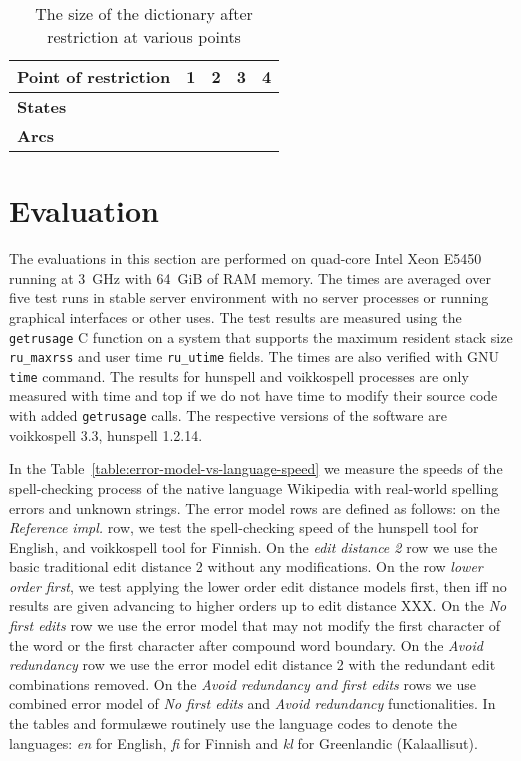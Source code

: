 \documentclass[11pt]{article}
\begin{document}
\begin{table}[h]
\begin{center}
\begin{scriptsize}
\begin{tabular}{|l|rrrr|}
\hline
\bf Point of restriction & \bf 1 & \bf 2 & \bf 3 & \bf 4 \\
\hline
\bf States \\
\bf Arcs \\
\hline
\end{tabular}
\caption{\label{restricted} The size of the dictionary after restriction at
various points}
\end{scriptsize}
\end{center}
\end{table}


\section{Evaluation}
\label{sec:evaluation}

The evaluations in this section are performed on quad-core Intel Xeon E5450
running at 3~GHz with 64~GiB of RAM memory. The times are averaged over five
test runs in stable server environment with no server processes or running
graphical interfaces or other uses. The test results are measured using the
\texttt{getrusage} C function on a system that supports the maximum resident
stack size \texttt{ru\_maxrss} and user time \texttt{ru\_utime} fields. The times
are also verified with GNU \texttt{time} command. The results for hunspell and
voikkospell processes are only measured with time and top if we do not have
time to modify their source code with added \texttt{getrusage} calls. The
respective versions of the software are voikkospell 3.3, hunspell 1.2.14.

In the Table~\ref{table:error-model-vs-language-speed} we measure the speeds of
the spell-checking process of the native language Wikipedia with real-world
spelling errors and unknown strings. The error model rows are defined as
follows: on the \emph{Reference impl.} row, we test the spell-checking speed of
the hunspell tool for English, and voikkospell tool for Finnish. On the
\emph{edit distance 2} row we use the basic traditional edit distance 2 without
any modifications. On the row \emph{lower order first}, we test applying the
lower order edit distance models first, then iff no results are given advancing
to higher orders up to edit distance XXX. On the \emph{No first edits} row we
use the error model that may not modify the first character of the word or the
first character after compound word boundary. On the \emph{Avoid redundancy}
row we use the error model edit distance 2 with the redundant edit combinations
removed. On the \emph{Avoid redundancy and first edits} rows we use combined
error model of \emph{No first edits} and \emph{Avoid redundancy}
functionalities.  In the tables and formul\ae we routinely use the language
codes to denote the languages: \emph{en} for English, \emph{fi} for Finnish and
\emph{kl} for Greenlandic (Kalaallisut). 
\end{document}

